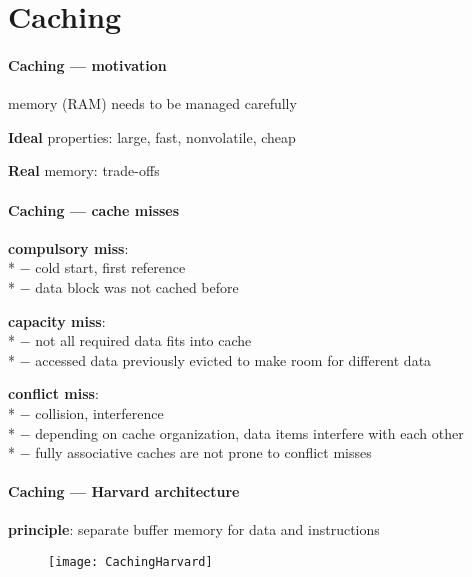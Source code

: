 \section{Caching}

\paragraph{Caching --- motivation}
\begin{items}
  \item memory (RAM) needs to be managed carefully
  \item \textbf{Ideal} properties: large, fast, nonvolatile, cheap
  \item \textbf{Real} memory: trade-offs
\end{items}

\paragraph{Caching --- cache misses}
\begin{items}
  \item \textbf{compulsory miss}: \\*
    $ - $ cold start, first reference \\*
    $ - $ data block was not cached before
  \item \textbf{capacity miss}: \\*
    $ - $ not all required data fits into cache \\*
    $ - $ accessed data previously evicted to make room for different data
  \item \textbf{conflict miss}: \\*
    $ - $ collision, interference \\*
    $ - $ depending on cache organization, data items interfere with each other \\*
    $ - $ fully associative caches are not prone to conflict misses
\end{items}

\paragraph{Caching --- Harvard architecture}
\begin{items}
  \item \textbf{principle}: separate buffer memory for data and instructions
\end{items}
\begin{figure}[H]\centering\label{CachingHarvard}\texttt{[image: CachingHarvard]}\end{figure}

